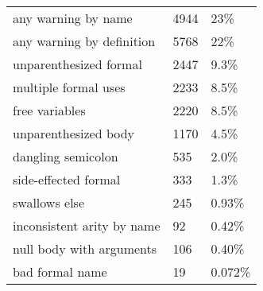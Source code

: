 \begin{tabular}{|l|l|l|} \hline
any warning by name & 4944 & 23\% \\ 
any warning by definition & 5768 & 22\% \\ 
unparenthesized formal & 2447 & 9.3\% \\ 
multiple formal uses & 2233 & 8.5\% \\ 
free variables & 2220 & 8.5\% \\ 
unparenthesized body & 1170 & 4.5\% \\ 
dangling semicolon & 535 & 2.0\% \\ 
side-effected formal & 333 & 1.3\% \\ 
swallows else & 245 & 0.93\% \\ 
inconsistent arity by name & 92 & 0.42\% \\ 
null body with arguments & 106 & 0.40\% \\ 
bad formal name & 19 & 0.072\% \\ 
\hline
\end{tabular}
